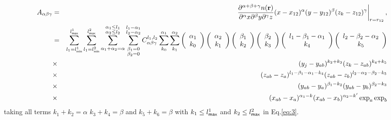 \documentclass[prb]{revtex4}
\begin{document}
\begin{eqnarray}
  \label{eq:collocate:7}
  A_{\alpha\beta\gamma} &=&\left.\frac{\partial^{\alpha+\beta+\gamma} n({\bf
      r})}{\partial^\alpha x \partial ^ \beta y \partial ^ \gamma z} (x - x_{12})^\alpha (y - y_{12})^\beta (z_k -z_{12})^\gamma\right|_{r=r_{12}},\\
  &=&  \sum_{l_1 = l_{\sf min}^1}^{l_{\sf max}^1} \sum_{l_1 = l_{\sf min}^2}^{l_{\sf max}^2} \sum_{\alpha_1 + \alpha_2 = \alpha}^{\substack{\alpha_1 \leq l_1\\ \alpha_2 \leq l_2}} \sum_{\substack{\beta_1 = 0\\\beta_2 = 0}} ^{\substack{l_1 - \alpha_1\\l_2 - \alpha_2}}  C^{l_1,l_2}_{\alpha\beta\gamma} \sum_{k_0} ^ {\alpha_1}\sum_{k_1} ^ {\alpha_2} \left(
            \begin{array}{c}
              {\alpha_1}\\
              k_0\end{array}
              \right)
              \left(
              \begin{array}{c}
                \alpha_2\\
                k_1
              \end{array}\right)
              \left(\begin{array}{c}
                \beta_1\\
                k_2\end{array}
                \right)
                \left(
                \begin{array}{c}
                  \beta_2\\
                  k_3
                \end{array}\right)
                \left(\begin{array}{c}
                  l_1 - \beta_1 - \alpha_1\\
                  k_4\end{array}
                  \right)
                  \left(
                  \begin{array}{c}
                    l_2 - \beta_2 - \alpha_2\\
                    k_5
                  \end{array}\right)\nonumber\\ &\times&
                  (y_j-y_{ab})^{k_2+k_3} (z_k - z_{ab}) ^ {k_4 + k_5}\nonumber\\ &\times& (z_{ab} - z_a) ^{l_1 - \beta_1 - \alpha_1 - k_4} (z_{ab} - z_b)^{l_2 - \alpha_2 - \beta_2-k_5}\nonumber  \\ &\times& (y_{ab} - y_a) ^{\beta_1 - k_2} (y_{ab} - y_b)^{\beta_2-k_3}\nonumber \\ &\times& (x_{ab}-x_a)^{\alpha_1 - k} (x_{ab}-x_b)^{\alpha_2 - k'} \exp_a\exp_b
\end{eqnarray}
taking all terms $k_1 + k_2 = \alpha$ $k_3 + k_4 = \beta$ and $k_5 + k_6 =
\beta$ with $k_1 \leq l^1_{\sf max}$ and $k_2 \leq l^2_{\sf max}$ in
Eq.\ref{eq:3}.
\end{document}
